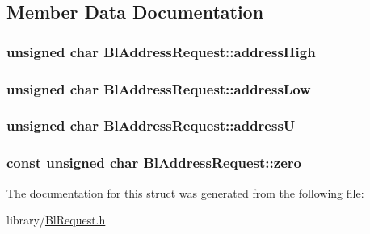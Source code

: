 \subsection{Member Data Documentation}
\hypertarget{struct_bl_address_request_a9e30628b0954a18ed75ce920a33d72ee}{
\subsubsection[{address\-High}]{\setlength{\rightskip}{0pt plus 5cm}unsigned char Bl\-Address\-Request\-::address\-High}}\label{struct_bl_address_request_a9e30628b0954a18ed75ce920a33d72ee}
\hypertarget{struct_bl_address_request_ae6a252f564542600cecd8c370ff25955}{
\subsubsection[{address\-Low}]{\setlength{\rightskip}{0pt plus 5cm}unsigned char Bl\-Address\-Request\-::address\-Low}}\label{struct_bl_address_request_ae6a252f564542600cecd8c370ff25955}
\hypertarget{struct_bl_address_request_afd1d17701a5905becce00ef6c0a0dbd0}{
\subsubsection[{address\-U}]{\setlength{\rightskip}{0pt plus 5cm}unsigned char Bl\-Address\-Request\-::address\-U}}\label{struct_bl_address_request_afd1d17701a5905becce00ef6c0a0dbd0}
\hypertarget{struct_bl_address_request_a04df4477476757417bfbd0b2b5a30a19}{
\subsubsection[{zero}]{\setlength{\rightskip}{0pt plus 5cm}const unsigned char Bl\-Address\-Request\-::zero}}\label{struct_bl_address_request_a04df4477476757417bfbd0b2b5a30a19}


The documentation for this struct was generated from the following file\-:\begin{DoxyCompactItemize}
\item 
library/\hyperlink{_bl_request_8h}{Bl\-Request.\-h}\end{DoxyCompactItemize}
